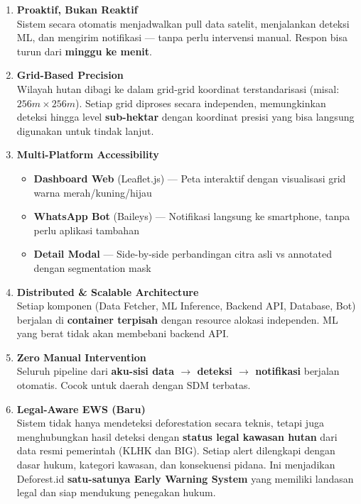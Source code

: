 \documentclass[11pt,a4paper]{article}
\begin{document}
\begin{enumerate}[label=\textbf{USP \arabic*:}]

    \item \textbf{Proaktif, Bukan Reaktif} \\
    Sistem secara otomatis menjadwalkan pull data satelit, menjalankan deteksi ML, dan mengirim notifikasi --- tanpa perlu intervensi manual. Respon bisa turun dari \textbf{minggu ke menit}.

    \item \textbf{Grid-Based Precision} \\
    Wilayah hutan dibagi ke dalam grid-grid koordinat terstandarisasi (misal: $256m \times 256m$). Setiap grid diproses secara independen, memungkinkan deteksi hingga level \textbf{sub-hektar} dengan koordinat presisi yang bisa langsung digunakan untuk tindak lanjut.

    \item \textbf{Multi-Platform Accessibility} \\
    \begin{itemize}
        \item \textbf{Dashboard Web} (Leaflet.js) --- Peta interaktif dengan visualisasi grid warna merah/kuning/hijau
        \item \textbf{WhatsApp Bot} (Baileys) --- Notifikasi langsung ke smartphone, tanpa perlu aplikasi tambahan
        \item \textbf{Detail Modal} --- Side-by-side perbandingan citra asli vs annotated dengan segmentation mask
    \end{itemize}

    \item \textbf{Distributed \& Scalable Architecture} \\
    Setiap komponen (Data Fetcher, ML Inference, Backend API, Database, Bot) berjalan di \textbf{container terpisah} dengan resource alokasi independen. ML yang berat tidak akan membebani backend API.

    \item \textbf{Zero Manual Intervention} \\
    Seluruh pipeline dari \textbf{aku-sisi data $\to$ deteksi $\to$ notifikasi} berjalan otomatis. Cocok untuk daerah dengan SDM terbatas.

    \item \textbf{\color{alertred} \textbf{Legal-Aware EWS} (Baru)} \\
    Sistem tidak hanya mendeteksi deforestation secara teknis, tetapi juga menghubungkan hasil deteksi dengan \textbf{status legal kawasan hutan} dari data resmi pemerintah (KLHK dan BIG). Setiap alert dilengkapi dengan dasar hukum, kategori kawasan, dan konsekuensi pidana. Ini menjadikan Deforest.id \textbf{satu-satunya Early Warning System} yang memiliki landasan legal dan siap mendukung penegakan hukum.

\end{enumerate}
\end{document}
